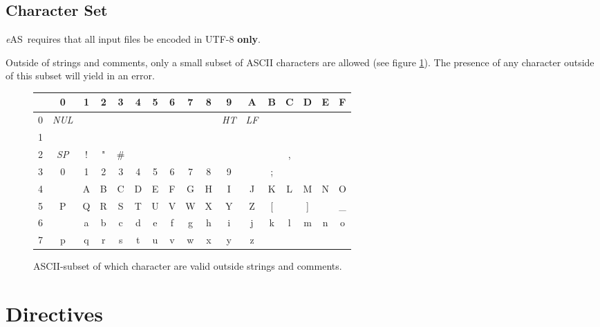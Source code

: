 \documentclass[a4paper]{article}
\newcommand*{\eAS}{\textup{\textit{e}AS}}
\begin{document}
		\subsection{Character Set}
			\label{sec:syntax:character_set}
			\eAS\ requires that all input files be encoded in UTF-8 \textbf{only}.

			Outside of strings and comments, only a small subset of ASCII characters are allowed (see figure \ref{fig:character_set}).
			The presence of any character outside of this subset will yield in an error.

			\begin{figure}[H]
				\centering

				\caption{ASCII-subset of which character are valid outside strings and comments.}
				\label{fig:character_set}

				\begin{tabular}{|c|c c c c c c c c c c c c c c c c|}
					\hline
					{} & \textbf{0} & \textbf{1} & \textbf{2} & \textbf{3} & \textbf{4} & \textbf{5} & \textbf{6} & \textbf{7} & \textbf{8} & \textbf{9} & \textbf{A} & \textbf{B} & \textbf{C} & \textbf{D} & \textbf{E} & \textbf{F} \\
					\hline
					0 & \textit{NUL} & {} & {} & {} & {} & {} & {} & {} & {} & \textit{HT} & \textit{LF} & {} & {} & {} & {} & {} \\
					1 & {} & {} & {} & {} & {} & {} & {} & {} & {} & {} & {} & {} & {} & {} & {} & {} \\
					2 & \textit{SP} & ! & " & \# & {} & {} & {} & {} & {} & {} & {} & {} & , & {} & {} & {} \\
					3 & 0 & 1 & 2 & 3 & 4 & 5 & 6 & 7 & 8 & 9 & {} & ; & {} & {} & {} & {} \\
					4 & {} & A & B & C & D & E & F & G & H & I & J & K & L & M & N & O \\
					5 & P & Q & R & S & T & U & V & W & X & Y & Z & [ & {} & ] & {} & \_ \\
					6 & {} & a & b & c & d & e & f & g & h & i & j & k & l & m & n & o \\
					7 & p & q & r & s & t & u & v & w & x & y & z & {} & {} & {} & {} & {} \\
					\hline
				\end{tabular}
			\end{figure}

	\clearpage
	\section{Directives}
		\label{sec:directives}
\end{document}
